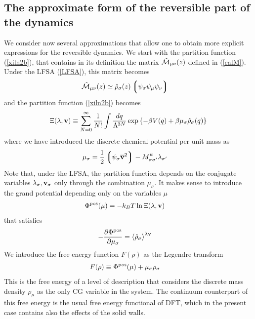 \documentclass[b5paper,openright,10pt]{book}
\newcommand{\llangle}{\left\langle}
\newcommand{\rrangle}{\right\rangle}
\newcommand{\llg}{\left\lgroup}
\newcommand{\rlg}{\right\rgroup}
\begin{document}
\begin{appendices}
\section{The approximate form of the reversible part of the dynamics}
\label{Ap:aproxRevDyn}
We consider now  several approximations that allow one  to obtain more
explicit expressions  for the reversible  dynamics. We start  with the
partition function (\ref{xiln2b}), that contains in its definition the
matrix $\hat{\cal M}_{\mu\nu}(z)$ defined  in (\ref{calM}).  Under the
LFSA (\ref{LFSA}), this matrix becomes
\begin{align}
  \hat{\cal M}_{\mu\nu}(z)
&\simeq\hat{\rho}_\sigma(z)\llg\psi_\sigma\psi_\mu\psi_\nu\rlg
\label{Mapprox}
\end{align}
and the partition function (\ref{xiln2b}) becomes
\begin{align}
\Xi(\lambda,{\bf v})\equiv \sum_{N=0}^\infty \frac{1}{N!}
\int \frac{dq}{\Lambda^{3N}}
\exp\left\{-\beta V(q)+\beta\mu_\sigma\hat{\rho}_{\sigma}(q)
\right\}
\label{xiln3}
\end{align}
where we have introduced the discrete chemical potential per unit mass as
\begin{align}
\mu_\sigma&=\frac{1}{2}\llg\psi_\sigma\overline{\bf v}^2\rlg-  M^\psi_{\sigma\sigma'}\lambda_{\sigma'}
\label{ChemPot}
\end{align}
Note  that, under  the LFSA,  the  partition function  depends on  the
conjugate variables  $\lambda_\sigma,{\bf v}_\sigma$ only  through the
combination  $\mu_\sigma$.   It makes  sense  to  introduce the  grand
potential depending only on the variables $\mu$
\begin{align}
  \Phi^{\rm pos}(\mu)&=-k_BT\ln \Xi(\lambda,{\bf v})
\end{align}
that satisfies
\begin{align}
-\frac{\partial \Phi^{\rm pos}}{\partial\mu_\sigma}&=
\llangle \hat{\rho}_\sigma\rrangle^{\lambda{\bf v}}
\end{align}
We introduce the free  energy function $F(\rho)$ as the Legendre
transform
\begin{align}
  F(\rho)&\equiv  \Phi^{\rm pos}(\mu)+ \mu_\sigma \rho_\sigma
\label{legAp}
\end{align}
This is the  free energy of a level of  description that considers the
discrete  mass density  $\rho_\mu$  as  the only  CG  variable in  the
system. The  continuum counterpart  of this free  energy is  the usual
free energy functional of DFT, which in the present case contains also
the effects of the solid walls. 


\end{appendices}
\end{document}
